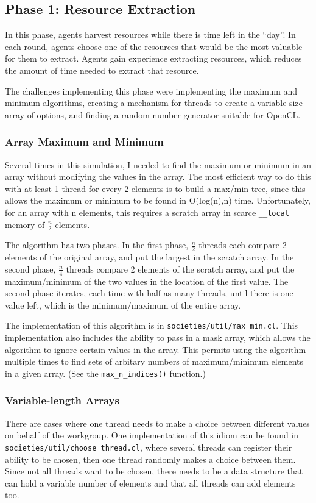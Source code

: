 \documentclass{article}
\begin{document}
\subsection{Phase 1: Resource Extraction}
In this phase, agents harvest resources while there is time left in the ``day''. In each round, agents choose one of the resources that would be the most valuable for them to extract. Agents gain experience extracting resources, which reduces the amount of time needed to extract that resource.

The challenges implementing this phase were implementing the maximum and minimum algorithms, creating a mechanism for threads to create a variable-size array of options, and finding a random number generator suitable for OpenCL.

\subsubsection{Array Maximum and Minimum}
Several times in this simulation, I needed to find the maximum or minimum in an array without modifying the values in the array. The most efficient way to do this with at least 1 thread for every 2 elements is to build a max/min tree, since this allows the maximum or minimum to be found in O(log(n),n) time. Unfortunately, for an array with n elements, this requires a scratch array in scarce \texttt{\_\_local} memory of $\frac{n}{2}$ elements.

The algorithm has two phases. In the first phase, $\frac{n}{2}$ threads each compare 2 elements of the original array, and put the largest in the scratch array. In the second phase, $\frac{n}{4}$ threads compare 2 elements of the scratch array, and put the maximum/minimum of the two values in the location of the first value. The second phase iterates, each time with half as many threads, until there is one value left, which is the minimum/maximum of the entire array.

The implementation of this algorithm is in \texttt{societies/util/max\_min.cl}. This implementation also includes the ability to pass in a mask array, which allows the algorithm to ignore certain values in the array. This permits using the algorithm multiple times to find sets of arbitary numbers of maximum/minimum elements in a given array. (See the \texttt{max\_n\_indices()} function.)


\subsubsection{Variable-length Arrays}
There are cases where one thread needs to make a choice between different values on behalf of the workgroup. One implementation of this idiom can be found in \texttt{societies/util/choose\_thread.cl}, where several threads can register their ability to be chosen, then one thread randomly makes a choice between them. Since not all threads want to be chosen, there needs to be a data structure that can hold a variable number of elements and that all threads can add elements too.
\end{document}
